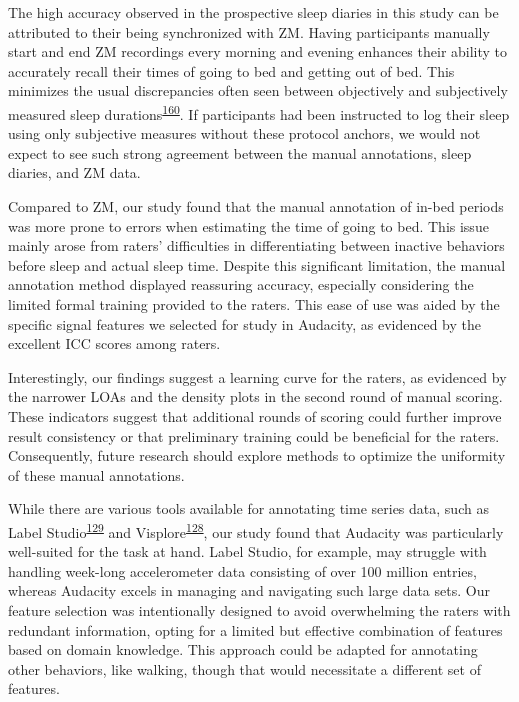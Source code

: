 \documentclass[
  10pt,
]{scrbook}
\begin{document}
The high accuracy observed in the prospective sleep diaries in this
study can be attributed to their being synchronized with ZM. Having
participants manually start and end ZM recordings every morning and
evening enhances their ability to accurately recall their times of going
to bed and getting out of bed. This minimizes the usual discrepancies
often seen between objectively and subjectively measured sleep
durations\textsuperscript{\protect\hyperlink{ref-aili_reliability_2017}{160}}.
If participants had been instructed to log their sleep using only
subjective measures without these protocol anchors, we would not expect
to see such strong agreement between the manual annotations, sleep
diaries, and ZM data.

Compared to ZM, our study found that the manual annotation of in-bed
periods was more prone to errors when estimating the time of going to
bed. This issue mainly arose from raters' difficulties in
differentiating between inactive behaviors before sleep and actual sleep
time. Despite this significant limitation, the manual annotation method
displayed reassuring accuracy, especially considering the limited formal
training provided to the raters. This ease of use was aided by the
specific signal features we selected for study in Audacity, as evidenced
by the excellent ICC scores among raters.

Interestingly, our findings suggest a learning curve for the raters, as
evidenced by the narrower LOAs and the density plots in the second round
of manual scoring. These indicators suggest that additional rounds of
scoring could further improve result consistency or that preliminary
training could be beneficial for the raters. Consequently, future
research should explore methods to optimize the uniformity of these
manual annotations.

While there are various tools available for annotating time series data,
such as Label
Studio\textsuperscript{\protect\hyperlink{ref-label_studio}{129}} and
Visplore\textsuperscript{\protect\hyperlink{ref-visplore}{128}}, our
study found that Audacity was particularly well-suited for the task at
hand. Label Studio, for example, may struggle with handling week-long
accelerometer data consisting of over 100 million entries, whereas
Audacity excels in managing and navigating such large data sets. Our
feature selection was intentionally designed to avoid overwhelming the
raters with redundant information, opting for a limited but effective
combination of features based on domain knowledge. This approach could
be adapted for annotating other behaviors, like walking, though that
would necessitate a different set of features.
\end{document}
